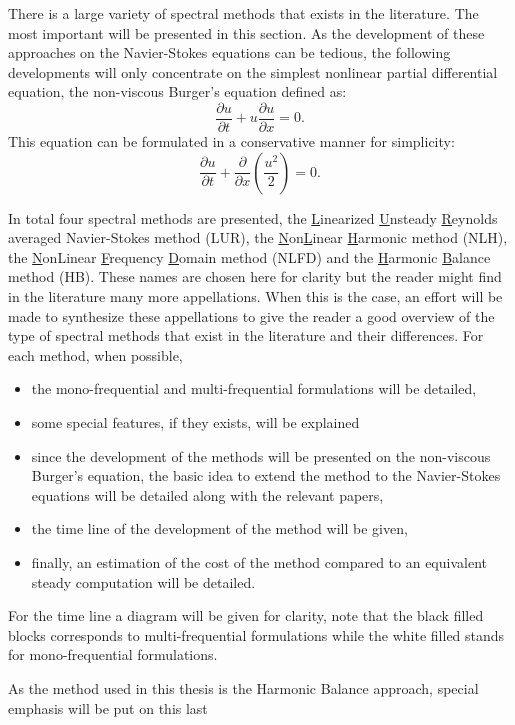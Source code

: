 
There is a large variety of spectral methods that exists in the
literature. The most important will be presented in this section.
As the development of these approaches on the Navier-Stokes equations
can be tedious, the following developments 
will only concentrate on the simplest
nonlinear partial differential equation, 
the non-viscous Burger's equation defined as:
\begin{equation}
	\frac{\partial u}{\partial t} + 
	u \frac{\partial u}{\partial x} = 
	0.
	\label{eq:sm_nonlinear_convection}
\end{equation}
This equation can be formulated in a conservative manner for simplicity:
\begin{equation}
	\frac{\partial u}{\partial t} + 
	\frac{\partial}{\partial x} \left( \frac{u^2}{2} \right) = 
	0.
	\label{eq:sm_nonlinear_convection_conservative}
\end{equation}

In total four spectral methods are presented, 
the \underline{L}inearized \underline{U}nsteady 
\underline{R}eynolds averaged
Navier-Stokes method (LUR), 
the \underline{N}on\underline{L}inear 
\underline{H}armonic method (NLH), the \underline{N}onLinear 
\underline{F}requency \underline{D}omain
method (NLFD) and the \underline{H}armonic \underline{B}alance 
method (HB).
These names are chosen here
for clarity but the reader might find in the literature many more
appellations. When this is the case, an effort will be made to synthesize
these appellations to give the reader a good 
overview of the type of spectral methods that exist in the literature
and their differences.
For each method, when possible,
\begin{itemize}
 	\item the mono-frequential and multi-frequential 
 	formulations will be detailed,
 	\item some special features, if they exists, will be explained
 	\item since the development of the methods will be 
 	presented on the non-viscous 
 	Burger's equation, 
	the basic idea to extend the method to the Navier-Stokes
	equations will be detailed along with the relevant papers,
	\item the time line of the development 
	of the method will be given,
	\item finally, an estimation of the cost of the method 
	compared to an equivalent steady computation will be detailed.
\end{itemize}
For the time line a diagram will be given for clarity, note
that the black filled blocks corresponds to multi-frequential
formulations while the white filled stands for mono-frequential
formulations.

As the method used in this thesis is the Harmonic Balance approach,
special emphasis will be put on this last

